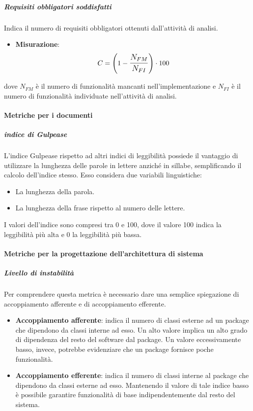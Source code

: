 \subparagraph{Requisiti obbligatori soddisfatti}
Indica il numero di requisiti obbligatori ottenuti dall'attività di analisi.
\begin{itemize}
	\item \textbf{Misurazione}: 
	$$C=\left(1-\mathlarger{\frac{N_{FM}}{N_{FI}}}\right) \cdot 100$$ 
\end{itemize}
dove $N_{FM}$ è il numero di funzionalità mancanti nell'implementazione e $N_{FI}$ è il numero di funzionalità individuate nell'attività di analisi. 



\paragraph{Metriche per i documenti}
\subparagraph{indice di Gulpease}
L'indice Gulpease rispetto ad altri indici di leggibilità possiede il vantaggio di utilizzare la lunghezza delle parole in lettere anziché in sillabe, semplificando il calcolo dell'indice stesso. Esso considera due variabili linguistiche:
\begin{itemize}
	\item La lunghezza della parola.
	\item La lunghezza della frase rispetto al numero delle lettere.
\end{itemize}

I valori dell'indice sono compresi tra 0 e 100, dove il valore 100 indica la leggibilità più alta e 0 la leggibilità più bassa.

\paragraph{Metriche per la progettazione dell'architettura di sistema}

\subparagraph{Livello di instabilità}
Per comprendere questa metrica è necessario dare una semplice spiegazione di accoppiamento afferente e di accoppiamento efferente.
\begin{itemize}
	\item
	\textbf{Accoppiamento afferente}: indica il numero di classi esterne ad un package che dipendono da classi interne ad esso.
	Un alto valore implica un alto grado di dipendenza del resto del software dal package. Un valore eccessivamente basso, invece, potrebbe evidenziare che un package fornisce poche funzionalità.
	\item
	\textbf{Accoppiamento efferente}: indica il numero di classi interne al package che dipendono da classi esterne ad esso.
	Mantenendo il valore di tale indice basso è possibile garantire funzionalità di base indipendentemente dal resto del sistema.
\end{itemize}

